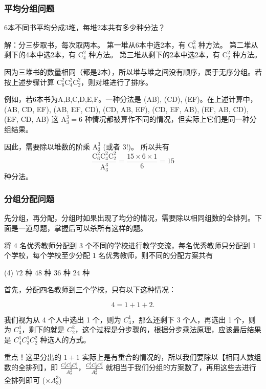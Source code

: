 \subsubsection{平均分组问题}

\begin{example}
    6本不同书平均分成3堆，每堆2本共有多少种分法？
\end{example}

\begin{solution}
    解：分三步取书，每次取两本。
    第一堆从6本中选2本，有 $\mathrm{C}_{6}^{2}$ 种方法。
    第二堆从剩下的4本中选2本，有 $\mathrm{C}_{4}^{2}$ 种方法。
    第三堆从剩下的2本中选2本，有 $\mathrm{C}_{2}^{2}$ 种方法。

    因为三堆书的数量相同（都是2本），所以堆与堆之间没有顺序，属于无序分组。若按上述步骤计算 $\mathrm{C}_{6}^{2} \mathrm{C}_{4}^{2} \mathrm{C}_{2}^{2}$，则对堆进行了排序。

    例如，若6本书为A,B,C,D,E,F。一种分法是 (AB), (CD), (EF)。在上述计算中，(AB, CD, EF), (AB, EF, CD), (CD, AB, EF), (CD, EF, AB), (EF, AB, CD), (EF, CD, AB) 这 $\mathrm{A}_{3}^{3}=6$ 种情况都被算作不同的情况，但实际上它们是同一种分组结果。

    因此，需要除以堆数的阶乘 $\mathrm{A}_{3}^{3}$ (或者 $3!$)。
    所以共有 $$ \frac{\mathrm{C}_{6}^{2} \mathrm{C}_{4}^{2} \mathrm{C}_{2}^{2}}{\mathrm{A}_{3}^{3}} = \frac{15 \times 6 \times 1}{6} = 15$$ 种分法。
\end{solution}

\subsubsection{分组分配问题}

先分组，再分配，分组时如果出现了均分的情况，需要除以相同组数的全排列。下面是一道母题，掌握后可以杀所有这样的题。

\vspace{0.4cm}

\begin{example}
    将 4 名优秀教师分配到 3 个不同的学校进行教学交流，每名优秀教师只分配到 1 个学校，每个学校至少分配 1 名优秀教师，则不同的分配方案共有
    \begin{tasks}(4)
        \task $72$ 种
        \task $48$ 种
        \task $36$ 种
        \task $24$ 种
    \end{tasks}
\end{example}

\begin{solution}
    首先，分配四名教师到三个学校，只有以下这种情况：

    $$ 4 = 1 + 1 + 2.$$

    我们视为从 4 个人中选出 1 个，则为 $C_4^1$，那么还剩下 3 个人，再选出 1 个，则为 $C_3^1$，剩下的就是 $C_2^2$，这个过程是分步骤的，根据分步乘法原理，应该最后结果是 $C_4^1C_3^1C_2^2$ 种选人的方式。

    重点！这里分出的 $1 + 1$ 实际上是有重合的情况的，所以我们要除以【相同人数组数的全排列】，即 $\frac{C_4^1C_3^1C_2^2}{A_2^2}$，$\frac{C_4^1C_3^1C_2^2}{A_2^2}$ 就相当于我们分组的方案数了，再用这些去进行全排列即可 ($\times A_3^3$)
\end{solution}

